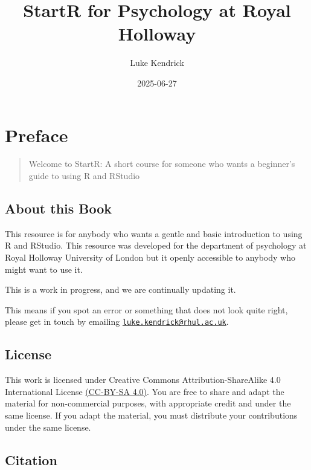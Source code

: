 \documentclass[
]{book}
\title{StartR for Psychology at Royal Holloway}
\author{Luke Kendrick}
\date{2025-06-27}
\let\oldsection\section
\renewcommand{\section}{\needspace{5\baselineskip}\oldsection}
\begin{document}
\maketitle

{
\setcounter{tocdepth}{1}
\tableofcontents
}
\chapter*{Preface}\label{preface}

\begin{quote}
Welcome to StartR: A short course for someone who wants a beginner's guide to using R and RStudio
\end{quote}

\section{About this Book}\label{about-this-book}

This resource is for anybody who wants a gentle and basic introduction to using R and RStudio. This resource was developed for the department of psychology at Royal Holloway University of London but it openly accessible to anybody who might want to use it.

This is a work in progress, and we are continually updating it.

This means if you spot an error or something that does not look quite right, please get in touch by emailing \href{mailto:luke.kendrick@rhul.ac.uk}{\nolinkurl{luke.kendrick@rhul.ac.uk}}.

\section{\texorpdfstring{\textbf{License}}{License}}\label{license}

This work is licensed under Creative Commons Attribution-ShareAlike 4.0 International License \href{https://creativecommons.org/licenses/by-sa/4.0/}{(CC-BY-SA 4.0)}. You are free to share and adapt the material for non-commercial purposes, with appropriate credit and under the same license. If you adapt the material, you must distribute your contributions under the same license.

\section{\texorpdfstring{\textbf{Citation}}{Citation}}\label{citation}
\end{document}
